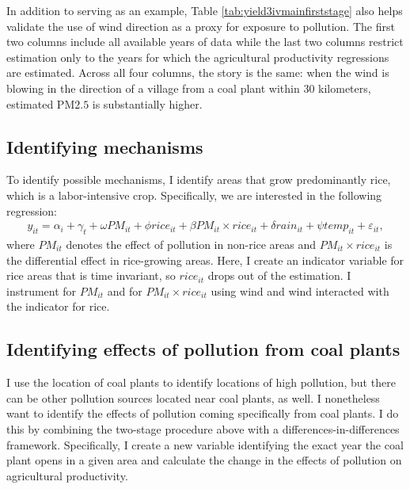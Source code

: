 \documentclass[
]{article}
\begin{document}
In addition to serving as an example, Table \ref{tab:yield3ivmainfirststage} also helps validate the use of wind direction as a proxy for exposure to pollution. The first two columns include all available years of data while the last two columns restrict estimation only to the years for which the agricultural productivity regressions are estimated. Across all four columns, the story is the same: when the wind is blowing in the direction of a village from a coal plant within 30 kilometers, estimated \(\mathrm{PM 2.5}\) is substantially higher.

\hypertarget{identifying-mechanisms}{%
\subsection{Identifying mechanisms}\label{identifying-mechanisms}}

To identify possible mechanisms, I identify areas that grow predominantly rice, which is a labor-intensive crop. Specifically, we are interested in the following regression:
\begin{gather} 
y_{it} = \alpha_{i} + \gamma_{t} + \omega PM_{it} + \phi rice_{it} + \beta PM_{it}\times rice_{it} + \delta rain_{it} + \psi temp_{it} + \varepsilon_{it},
\end{gather}
where \(PM_{it}\) denotes the effect of pollution in non-rice areas and \(PM_{it}\times rice_{it}\) is the differential effect in rice-growing areas. Here, I create an indicator variable for rice areas that is time invariant, so \(rice_{it}\) drops out of the estimation. I instrument for \(PM_{it}\) and for \(PM_{it}\times rice_{it}\) using wind and wind interacted with the indicator for rice.

\hypertarget{identifying-effects-of-pollution-from-coal-plants}{%
\subsection{Identifying effects of pollution from coal plants}\label{identifying-effects-of-pollution-from-coal-plants}}

I use the location of coal plants to identify locations of high pollution, but there can be other pollution sources located near coal plants, as well. I nonetheless want to identify the effects of pollution coming specifically from coal plants. I do this by combining the two-stage procedure above with a differences-in-differences framework. Specifically, I create a new variable identifying the exact year the coal plant opens in a given area and calculate the change in the effects of pollution on agricultural productivity.
\end{document}
